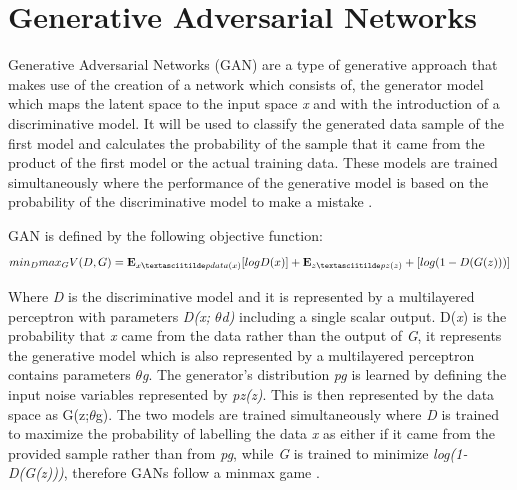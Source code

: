 \section{Generative Adversarial Networks}

Generative Adversarial Networks  (GAN) are a type of generative approach that makes use of the creation of a network which consists of, the generator model which maps the latent space to the input space \textit{x} and with the introduction of a discriminative model. It will be used to classify the generated data sample of the first model and calculates the probability of the sample that it came from the product of the first model or the actual training data. These models  are trained simultaneously where the performance of the generative model is based on the probability of the discriminative model to make a mistake  \citet{goodfellow:2014}. 

GAN is defined by the following objective function:
\begin{equation}\label{minmax}
min_{D}max_{G} V(D,G)= \mathbf{E}_{x \textasciitilde pdata(x)}[log D(x)] + \mathbf{E}_{z\textasciitilde pz(z)} + [log(1 - D(G(z)))]
\end{equation}

Where \textit{D} is the discriminative model and it is represented by a multilayered perceptron with parameters \textit{D(x; $\theta$d)} including a single scalar output. D(\textit{x}) is the probability that \textit{x}  came from the data rather than the output of \textit{G}, it represents the generative model which is also represented by a multilayered perceptron contains parameters $\theta$\textit{g}. The generator's distribution \textit{pg} is learned by defining the input noise variables represented by \textit{pz(z)}. This is then represented by the data space as G(z;$\theta$g). The two models are trained simultaneously where \textit{D} is trained to maximize the probability of labelling the data \textit{x} as either if it came from the provided sample rather than from \textit{pg}, while \textit{G} is trained to minimize \textit{log(1-D(G(z)))}, therefore GANs follow a minmax game \citet{goodfellow:2014}.


